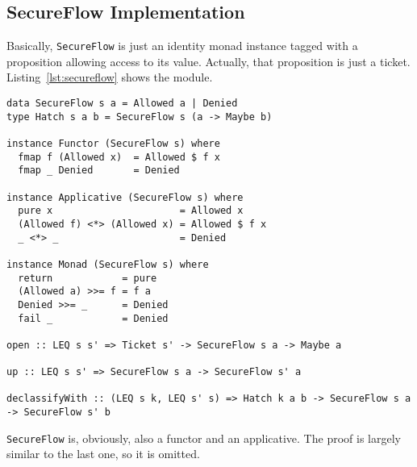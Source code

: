\subsection{SecureFlow Implementation}
Basically, \texttt{SecureFlow} is just an identity monad instance tagged with a proposition allowing access to its value. Actually, that proposition is just a ticket. Listing~\ref{lst:secureflow} shows the module.
\begin{lstlisting}[caption={SecureFlow monad}, label={lst:secureflow}, breaklines=true]
data SecureFlow s a = Allowed a | Denied
type Hatch s a b = SecureFlow s (a -> Maybe b)

instance Functor (SecureFlow s) where
  fmap f (Allowed x)  = Allowed $ f x
  fmap _ Denied       = Denied

instance Applicative (SecureFlow s) where
  pure x                      = Allowed x
  (Allowed f) <*> (Allowed x) = Allowed $ f x
  _ <*> _                     = Denied

instance Monad (SecureFlow s) where
  return            = pure
  (Allowed a) >>= f = f a
  Denied >>= _      = Denied
  fail _            = Denied
  
open :: LEQ s s' => Ticket s' -> SecureFlow s a -> Maybe a

up :: LEQ s s' => SecureFlow s a -> SecureFlow s' a

declassifyWith :: (LEQ s k, LEQ s' s) => Hatch k a b -> SecureFlow s a -> SecureFlow s' b
\end{lstlisting}
%
%

\texttt{SecureFlow} is, obviously, also a functor and an applicative. The proof is largely similar to the last one, so it is omitted.